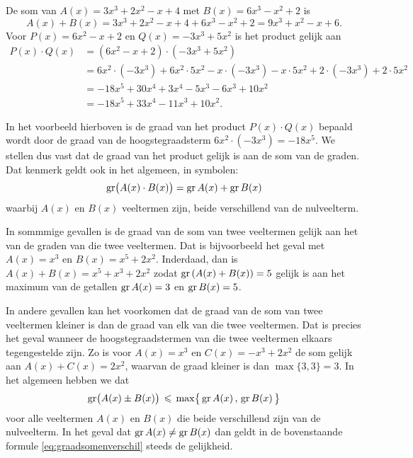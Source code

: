 \documentclass{ximera}
\begin{document}
\begin{example}
De som van $A(x) = 3x^3+2x^2-x+4$ met $B(x) = 6x^3-x^2+2$ is 
\[
A(x) + B(x) = 3x^3+2x^2-x+4 + 6x^3-x^2+2 = 9x^3 + x^2 - x + 6.
\]
Voor $P(x) = 6x^2-x+2$ en $Q(x) = -3x^3+5x^2$ is het product gelijk aan
\begin{align*}
P(x) \cdot Q(x) 
& = (6x^2-x+2) \cdot (-3x^3+5x^2) \\
& = 6x^2 \cdot (-3x^3) + 6x^2\cdot 5x^2 - x \cdot(-3x^3) - x \cdot 5x^2 + 2 \cdot(-3x^3) + 2 \cdot 5x^2 \\
& = -18x^5 + 30x^4 + 3x^4 - 5x^3 - 6x^3 + 10x^2 \\
& = -18x^5 + 33x^4 - 11x^3 + 10x^2.
\end{align*}
\end{example}




In het voorbeeld hierboven is de graad van het product $P(x) \cdot Q(x)$ bepaald wordt door de graad van de hoogstegraadsterm $6x^2 \cdot (-3x^3) = -18 x^{5}$. We stellen dus vast dat de graad van het product gelijk is aan de som van de graden. Dat kenmerk geldt ook in het algemeen, in symbolen: 
\begin{equation} \label{eq:graadproduct}
\operatorname{gr}\bigl( A(x) \cdot B(x) \bigr) = \operatorname{gr} A(x) + \operatorname{gr} B(x)
\end{equation}
waarbij $A(x)$ en $B(x)$ veeltermen zijn, beide verschillend van de nulveelterm. 

In sommmige gevallen is de graad van de som van twee veeltermen gelijk aan het  van de graden van die twee veeltermen. Dat is bijvoorbeeld het geval met 
$A(x) = x^3$ en $B(x) = x^5 + 2x^2$. Inderdaad, dan is $A(x) + B(x) = x^5 + x^3 + 2x^2$ zodat $\operatorname{gr}\left(A(x) + B(x)\right) = 5$ gelijk is aan het maximum van de getallen $\operatorname{gr} A(x) = 3$ en $\operatorname{gr} B(x) = 5$. %

In andere gevallen kan het voorkomen dat de graad van de som van twee veeltermen kleiner is dan de graad van elk van die twee veeltermen. Dat is precies het geval wanneer de hoogste\-graadstermen van die twee veeltermen elkaars tegengestelde zijn. Zo is voor $A(x) = x^3$ en $C(x) = -x^3 + 2x^2$ de som gelijk aan $A(x) + C(x) = 2x^2$, waarvan de graad kleiner is dan $\max\{3,3\} = 3$. In het algemeen hebben we dat  
\begin{equation} \label{eq:graadsomenverschil}
\operatorname{gr}\bigl( A(x) \pm B(x) \bigr) \, \leqslant \, \max \bigl\{ \,\operatorname{gr} A(x)\, , \, \operatorname{gr} B(x) \, \bigr\}
\end{equation}
voor alle veeltermen $A(x)$ en $B(x)$ die beide verschillend zijn van de nulveelterm. In het geval dat $\operatorname{gr} A(x) \neq \operatorname{gr} B(x)$ dan geldt in de bovenstaande formule \eqref{eq:graadsomenverschil} steeds de gelijkheid. 
\end{document}
